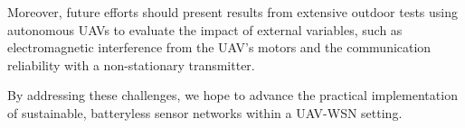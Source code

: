 \documentclass[conference]{IEEEtran}
\begin{document}
Moreover, future efforts should present results from extensive outdoor tests using autonomous UAVs to evaluate the impact of external variables, such as electromagnetic interference from the UAV's motors and the communication reliability with a non-stationary transmitter.

By addressing these challenges, we hope to advance the practical implementation of sustainable, batteryless sensor networks within a UAV-WSN setting.



\end{document}

